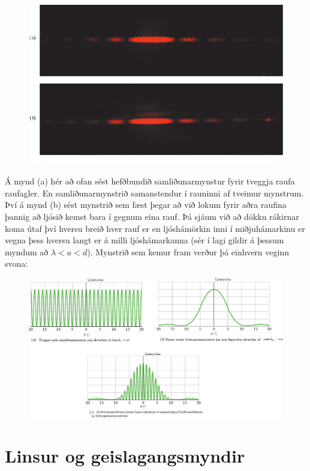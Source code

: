 \begin{figure}[H]
    \centering
    \includegraphics[scale = 0.9]{figures/jearl-walker.pdf}
\end{figure}
Á mynd (a) hér að ofan sést hefðbundið samliðunarmynstur fyrir tveggja raufa raufagler. En samliðunarmynstrið samanstendur í rauninni af tveimur mynstrum. Því á mynd (b) sést mynstrið sem fæst þegar að við lokum fyrir aðra raufina þannig að ljósið kemst bara í gegnum eina rauf. Þá sjáum við að dökku rákirnar koma útaf því hversu breið hver rauf er en ljóshámörkin inni í miðjuhámarkinu er vegna þess hversu langt er á milli ljóshámarkanna (sér í lagi gildir 
á þessum myndum að $\lambda < a < d $). Mynstrið sem kemur fram verður þá einhvern veginn svona:

\begin{figure}[H]
    \centering
    \includegraphics{figures/samlidun.pdf}
\end{figure}


\section{Linsur og geislagangsmyndir}

